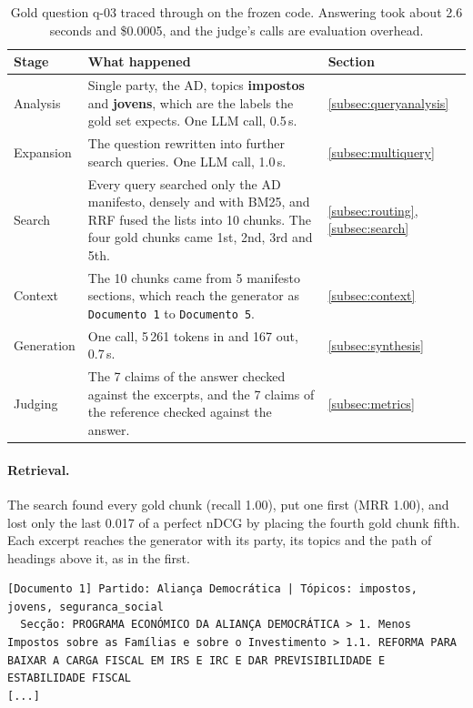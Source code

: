 \begin{table}[htbp]
    \centering
    \footnotesize
    \begin{tabular}{|l|p{}|l|}
        \hline
        \textbf{Stage} & \textbf{What happened} & \textbf{Section} \\
        \hline
        Analysis & Single party, the AD, topics \textbf{impostos} and
        \textbf{jovens}, which are the labels the gold set expects. One LLM call,
        0.5\,s. & \ref{subsec:queryanalysis} \\
        Expansion & The question rewritten into further search queries. One LLM
        call, 1.0\,s. & \ref{subsec:multiquery} \\
        Search & Every query searched only the AD manifesto, densely and with
        BM25, and RRF fused the lists into 10 chunks. The four gold chunks came
        1st, 2nd, 3rd and 5th. & \ref{subsec:routing}, \ref{subsec:search} \\
        Context & The 10 chunks came from 5 manifesto sections, which reach the
        generator as \texttt{Documento 1} to \texttt{Documento 5}. &
        \ref{subsec:context} \\
        Generation & One call, 5\,261 tokens in and 167 out, 0.7\,s. &
        \ref{subsec:synthesis} \\
        Judging & The 7 claims of the answer checked against the excerpts, and
        the 7 claims of the reference checked against the answer. &
        \ref{subsec:metrics} \\
        \hline
    \end{tabular}
    \caption[One question, end to end]{Gold question q-03 traced through
    \sysname{} on the frozen code. Answering took about 2.6 seconds and
    \$0.0005, and the judge's calls are evaluation overhead.}
    \label{tab:trace}
\end{table}

\paragraph{Retrieval.} The search found every gold chunk (recall 1.00), put
one first (MRR 1.00), and lost only the last 0.017 of a perfect nDCG by
placing the fourth gold chunk fifth. Each excerpt reaches the generator with
its party, its topics and the path of headings above it, as in the first.

\begin{Verbatim}[fontsize=\scriptsize, breaklines=true, frame=single]
[Documento 1] Partido: Aliança Democrática | Tópicos: impostos, jovens, seguranca_social
  Secção: PROGRAMA ECONÓMICO DA ALIANÇA DEMOCRÁTICA > 1. Menos Impostos sobre as Famílias e sobre o Investimento > 1.1. REFORMA PARA BAIXAR A CARGA FISCAL EM IRS E IRC E DAR PREVISIBILIDADE E ESTABILIDADE FISCAL
[...]
\end{Verbatim}

